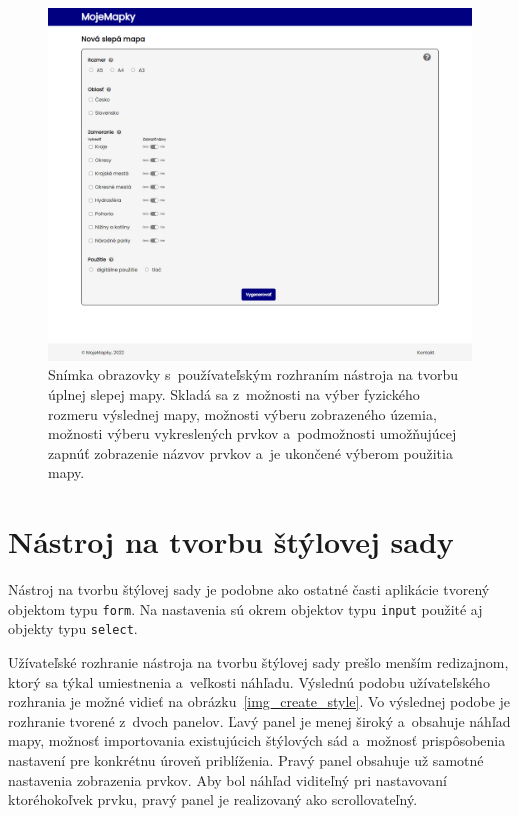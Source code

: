 \begin{figure}[hbt]
	\centering
	\includegraphics[width=1\textwidth]{obrazky-figures/create_blind.png}
	\caption{Snímka obrazovky s~používateľským rozhraním nástroja na tvorbu úplnej slepej mapy. Skladá sa z~možnosti na výber fyzického rozmeru výslednej mapy, možnosti výberu zobrazeného územia, možnosti výberu vykreslených prvkov a~podmožnosti umožňujúcej zapnúť zobrazenie názvov prvkov a~je ukončené výberom použitia mapy.}
	\label{img_create_blind}
\end{figure}


\section{Nástroj na tvorbu štýlovej sady}
\label{create_style}
Nástroj na tvorbu štýlovej sady je podobne ako ostatné časti aplikácie tvorený objektom typu {\tt form}. Na nastavenia sú okrem objektov typu {\tt input} použité aj objekty typu {\tt select}.

Užívateľské rozhranie nástroja na tvorbu štýlovej sady prešlo menším redizajnom, ktorý sa týkal umiestnenia a~veľkosti náhľadu. Výslednú podobu užívateľského rozhrania je možné vidieť na obrázku~\ref{img_create_style}. Vo výslednej podobe je rozhranie tvorené z~dvoch panelov. Ľavý panel je menej široký a~obsahuje náhľad mapy, možnosť importovania existujúcich štýlových sád a~možnosť prispôsobenia nastavení pre konkrétnu úroveň priblíženia. Pravý panel obsahuje už samotné nastavenia zobrazenia prvkov. Aby bol náhľad viditeľný pri nastavovaní ktoréhokoľvek prvku, pravý panel je realizovaný ako scrollovateľný.

